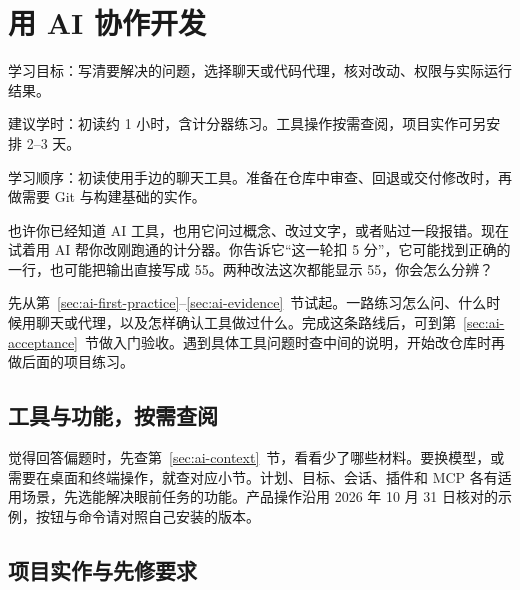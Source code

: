 \chapter{用 AI 协作开发}
\label{chap:ai-development}

\begin{introduction}
  \item 学习目标：写清要解决的问题，选择聊天或代码代理，核对改动、权限与实际运行结果。
  \item 建议学时：初读约 1 小时，含计分器练习。工具操作按需查阅，项目实作可另安排 2--3 天。
  \item 学习顺序：初读使用手边的聊天工具。准备在仓库中审查、回退或交付修改时，再做需要 Git 与构建基础的实作。
\end{introduction}

\begingroup
\setlength{\emergencystretch}{3em}

也许你已经知道 AI 工具，也用它问过概念、改过文字，或者贴过一段报错。现在试着用 AI 帮你改刚跑通的计分器。你告诉它“这一轮扣 5 分”，它可能找到正确的一行，也可能把输出直接写成 55。两种改法这次都能显示 55，你会怎么分辨？

先从第~\ref{sec:ai-first-practice}--\ref{sec:ai-evidence}~节试起。一路练习怎么问、什么时候用聊天或代理，以及怎样确认工具做过什么。完成这条路线后，可到第~\ref{sec:ai-acceptance}~节做入门验收。遇到具体工具问题时查中间的说明，开始改仓库时再做后面的项目练习。






\section*{工具与功能，按需查阅}
{}

觉得回答偏题时，先查第~\ref{sec:ai-context}~节，看看少了哪些材料。要换模型，或需要在桌面和终端操作，就查对应小节。计划、目标、会话、插件和 MCP 各有适用场景，先选能解决眼前任务的功能。产品操作沿用 2026 年 10 月 31 日核对的示例，按钮与命令请对照自己安装的版本。





\section*{项目实作与先修要求}
{}


